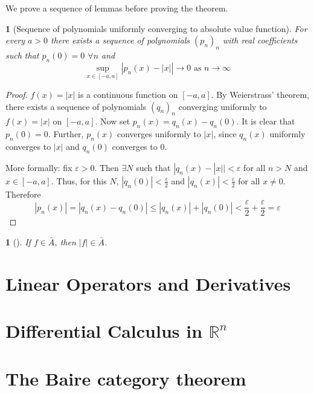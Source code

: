 \documentclass[11pt]{article}
\numberwithin{equation}{section}
\theoremstyle{plain}
\newtheorem{lemma}[theorem]{\color{ForestGreen}{\textbf{Lemma}}}
\theoremstyle{definition}
\newcommand\abs[1]{\left| #1 \right|}
\newcommand{\1}{\mathbbm 1}
\newcommand{\e}{\varepsilon}
\newcommand{\RR}{\mathbb R}
\begin{document}
We prove a sequence of lemmas before proving the theorem. 

\begin{lemma}[Sequence of polynomials uniformly converging to absolute value function]
	For every $a > 0$ there exists a sequence of polynomials $(p_n)_n$ with real coefficients such that $p_n(0) = 0$ $\forall n$ and
	\begin{equation}
		\sup_{x \in [-a,a]}\abs{p_n(x) - \abs{x}} \to 0 \text{ as } n \to \infty
	\end{equation}
\end{lemma}
\begin{proof}
	$f(x) = \abs{x}$ is a continuous function on $[-a,a]$. By Weierstrass' theorem, there exists a sequence of polynomials $(q_n)_n$ converging uniformly to $f(x) = \abs{x}$ on $[-a,a]$. Now set $p_n(x) = q_n(x) - q_n(0)$. It is clear that $p_n(0) = 0$. Further, $p_n(x)$ converges uniformly to $|x|$, since $q_n(x)$ uniformly converges to $|x|$ and $q_n(0)$ converges to 0. 

	More formally: fix $\e > 0$. Then $\exists N$ such that $|q_n(x) - |x|| < \e$ for all $n>N$ and $x \in [-a,a]$. Thus, for this $N$, $|q_n(0)|< \frac{\e}{2}$ and $|q_n(x)| < \frac{\e}{2}$ for all $x \neq 0$. Therefore
	\begin{equation}
		|p_n(x)| = |q_n(x) - q_n(0)| \leq |q_n(x)| + |q_n(0)| < \frac{\e}{2} + \frac{\e}{2} = \e
	\end{equation}
\end{proof}

\begin{lemma}[]
	If $f \in \bar{A}$, then $|f| \in \bar{A}$.
\end{lemma}













\newpage
\section{Linear Operators and Derivatives}

\section[Differential Calculus in Rn]{Differential Calculus in $\RR^n$}

\section{The Baire category theorem}
\end{document}
